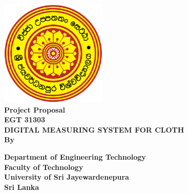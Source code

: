 \documentclass[12pt,a4paper]{article}
\begin{document}
\begin{titlepage}
\center %
{
\includegraphics[width=2in,height=2in,keepaspectratio]{logo.png}\\[0.5cm]
\fontsize{16pt}{24}\selectfont \textbf{Project Proposal}\\[0.5cm]
\fontsize{16pt}{24}\selectfont \textbf{EGT 31303}\\[0.75cm]
\fontsize{24pt}{30}\selectfont \textbf{\uppercase{Digital Measuring System for Cloth}}\\[1.5cm]
\fontsize{16pt}{24}\selectfont \textbf{By}\\[0.5cm]
\fontsize{12pt}{12}


\vspace{1.5cm}
\fontsize{12pt}{12}\selectfont \textbf {Department of Engineering Technology \\ Faculty of Technology\\University of Sri Jayewardenepura\\ Sri Lanka}\\[0.5cm]
}

\vfill %

\end{titlepage}
\end{document}
